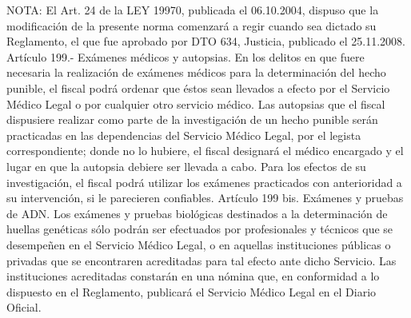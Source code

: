 NOTA:
      El Art. 24 de la LEY 19970, publicada el 06.10.2004, dispuso que la modificación de la presente norma comenzará a regir cuando sea dictado su Reglamento, el que fue aprobado por DTO 634, Justicia, publicado el 25.11.2008.
    Artículo 199.- Exámenes médicos y autopsias. En los delitos en que fuere necesaria la realización de exámenes médicos para la determinación del hecho punible, el fiscal podrá ordenar que éstos sean llevados a efecto por el Servicio Médico Legal o por cualquier otro servicio médico.
    Las autopsias que el fiscal dispusiere realizar como parte de la investigación de un hecho punible serán practicadas en las dependencias del Servicio Médico Legal, por el legista correspondiente; donde no lo hubiere, el fiscal designará el médico encargado y el lugar en que la autopsia debiere ser llevada a cabo.
    Para los efectos de su investigación, el fiscal podrá utilizar los exámenes practicados con anterioridad a su intervención, si le parecieren confiables.
    Artículo 199 bis. Exámenes y pruebas de ADN. Los exámenes y pruebas biológicas destinados a la determinación de huellas genéticas sólo podrán ser efectuados por profesionales y técnicos que se desempeñen en el Servicio Médico Legal, o en aquellas instituciones públicas o privadas que se encontraren acreditadas para tal efecto ante dicho Servicio.
    Las instituciones acreditadas constarán en una nómina que, en conformidad a lo dispuesto en el Reglamento, publicará el Servicio Médico Legal en el Diario Oficial.


